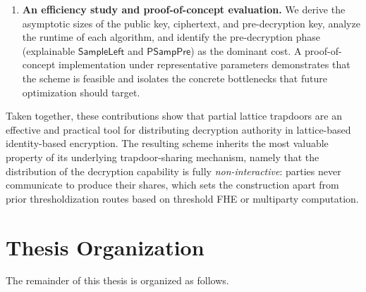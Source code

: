 \begin{enumerate}
    \item \textbf{An efficiency study and proof-of-concept evaluation.}
    We derive the asymptotic sizes of the public key, ciphertext, and pre-decryption
    key, analyze the runtime of each algorithm, and identify the pre-decryption phase
    (explainable $\mathsf{SampleLeft}$ and $\mathsf{PSampPre}$) as the dominant cost.
    A proof-of-concept implementation under representative parameters demonstrates
    that the scheme is feasible and isolates the concrete bottlenecks that future
    optimization should target.
\end{enumerate}
 
Taken together, these contributions show that partial lattice trapdoors are an
effective and practical tool for distributing decryption authority in
lattice-based identity-based encryption. The resulting scheme inherits the most
valuable property of its underlying trapdoor-sharing mechanism, namely that the
distribution of the decryption capability is fully \emph{non-interactive}: parties
never communicate to produce their shares, which sets the construction apart from
prior thresholdization routes based on threshold FHE or multiparty computation.




\label{section:1.4}

\section{Thesis Organization}

The remainder of this thesis is organized as follows.

